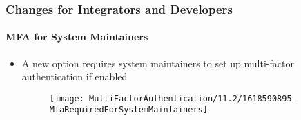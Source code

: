 %

\begin{frame}[fragile]
	\frametitle{Changes for Integrators and Developers}
	\framesubtitle{MFA for System Maintainers}


	\begin{itemize}
		\item A new option requires system maintainers to set up multi-factor
			authentication if enabled
		\vspace{0.4cm}
		\begin{figure}
			\texttt{[image: MultiFactorAuthentication/11.2/1618590895-MfaRequiredForSystemMaintainers]}
		\end{figure}
	\end{itemize}
\end{frame}

